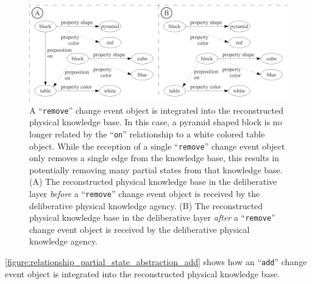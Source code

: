 \begin{figure}
\centering
\includegraphics[width=12cm]{gfx/relationship_partial_state_abstraction_remove}
\caption[A ``{\tt{remove}}'' change event object is integrated into
  the reconstructed physical knowledge base.]{A ``{\tt{remove}}''
  change event object is integrated into the reconstructed physical
  knowledge base.  In this case, a pyramid shaped block is no longer
  related by the ``{\tt{on}}'' relationship to a white colored table
  object.  While the reception of a single ``{\tt{remove}}'' change
  event object only removes a single edge from the knowledge base,
  this results in potentially removing many partial states from that
  knowledge base.  (A) The reconstructed physical knowledge base in
  the deliberative layer \emph{before} a ``{\tt{remove}}'' change
  event object is received by the deliberative physical knowledge
  agency.  (B) The reconstructed physical knowledge base in the
  deliberative layer \emph{after} a ``{\tt{remove}}'' change event
  object is received by the deliberative physical knowledge agency.}
\label{figure:relationship_partial_state_abstraction_remove}
\end{figure}
{\mbox{\autoref{figure:relationship_partial_state_abstraction_add}}}
shows how an ``{\tt{add}}'' change event object is integrated into the
reconstructed physical knowledge base.
